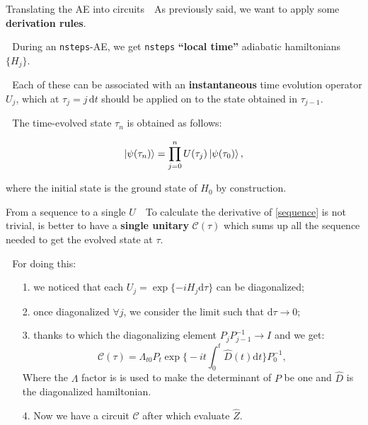\documentclass[8pt, xcolor={svgnames}, hyperref={colorlinks, linkcolor=black, citecolor=amethyst, urlcolor=amethyst}]{beamer}
\begin{document}
\begin{frame}{Translating the AE into circuits}
\large 
 \faArrowCircleRight\,\, As previously said, we want to apply some \textbf{derivation rules}.
\pause

 \faArrowCircleRight\,\, During an \texttt{nsteps}-AE, we get \texttt{nsteps} 
 \textbf{``local time''} adiabatic hamiltonians $\{H_j\}$. 
\pause

\faArrowCircleRight\,\, Each of these can be associated with an \textbf{instantaneous} 
time evolution operator $U_j$, which at $\tau_j = j\,\text{d}t$ 
should be applied on to the state obtained in $\tau_{j-1}$.
\pause 

\faArrowCircleRight\,\, The time-evolved state $\tau_n$ is obtained as follows: 

\begin{equation}
  \ket{\psi(\tau_n)} = \prod_{j=0}^{n} U(\tau_j)\ket{\psi(\tau_{0})},
  \label{sequence} 
\end{equation}

where the initial state is the ground state of $H_0$ by construction.

\end{frame}

\begin{frame}{From a sequence to a single $U$}
\large
\faArrowCircleRight\,\, To calculate the derivative of \eqref{sequence}
is not trivial, is better to have a \textbf{single unitary} $\mathcal{C}(\tau)$ 
which sums up all the sequence needed to get the evolved state at $\tau$.
\pause

\faArrowCircleRight\,\, For doing this:
\pause
\begin{itemize}[noitemsep]
    \item[1.] we noticed that each $U_j=\exp\{-iH_j\text{d}\tau \}$ can be 
    diagonalized;
    \pause
    \item[2.] once diagonalized $\forall j$, we consider the limit
    such that $\text{d}\tau \to 0$;
    \pause
    \item[3.] thanks to which the diagonalizing element $P_j P_{j-1}^{-1}\to I$ 
    and we get:
    \begin{equation}
  \mathcal{C}(\tau) = \Lambda_{t0}
   P_t \exp \bigg\{-i t \int_{0}^{t} \hat{D}(t) \text{d}t \bigg\} P_0^{-1}, 
    \end{equation}  
    Where the $\Lambda$ factor is is used to make the determinant of $P$ be one
    and $\hat{D}$ is the diagonalized hamiltonian.
    \pause
    \item[4.] Now we have a circuit $\mathcal{C}$ after which evaluate $\hat{Z}$.
\end{itemize}

\end{frame}
\end{document}
